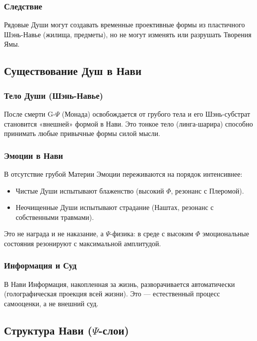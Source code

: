 \documentclass[a4paper,12pt]{article}
\begin{document}
\subsubsection{Следствие}

Рядовые Души могут создавать временные проективные формы из пластичного Шэнь-Навье (жилища, предметы), но не могут изменять или разрушать Творения Ямы.

\subsection{Существование Душ в Нави}

\subsubsection{Тело Души (Шэнь-Навье)}

После смерти G-$\Psi$ (Монада) освобождается от грубого тела и его Шэнь-субстрат становится «внешней» формой в Нави. Это тонкое тело (линга-шарира) способно принимать любые привычные формы силой мысли.

\subsubsection{Эмоции в Нави}

В отсутствие грубой Материи Эмоции переживаются на порядок интенсивнее:

\begin{itemize}
	\item Чистые Души испытывают блаженство (высокий $\Phi$, резонанс с Плеромой).
	\item Неочищенные Души испытывают страдание (Наштах, резонанс с собственными травмами).
\end{itemize}

Это не награда и не наказание, а $\Psi$-физика: в среде с высоким $\Phi$ эмоциональные состояния резонируют с максимальной амплитудой.

\subsubsection{Информация и Суд}

В Нави Информация, накопленная за жизнь, разворачивается автоматически (голографическая проекция всей жизни). Это — естественный процесс самооценки, а не внешний суд.

\subsection{Структура Нави ($\Psi$-слои)}
\end{document}
